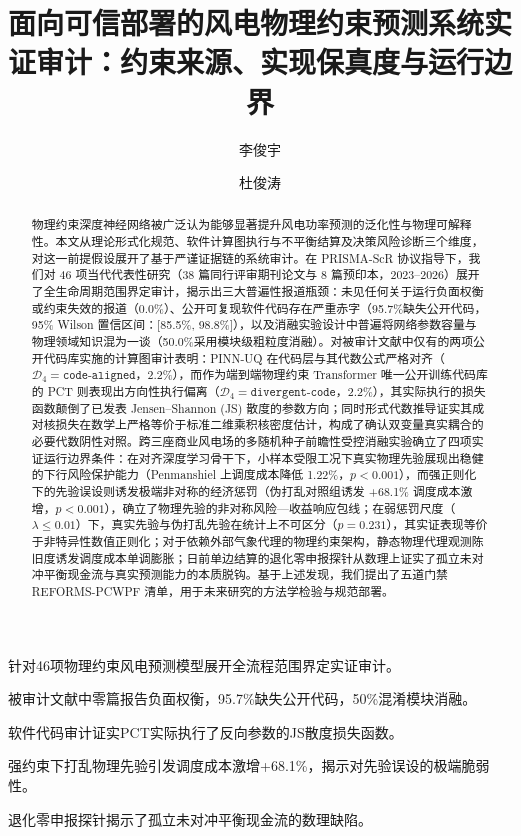 \documentclass[3p,twocolumn]{elsarticle}
\theoremstyle{definition}
\theoremstyle{remark}
\begin{document}
\begin{frontmatter}

\title{面向可信部署的风电物理约束预测系统实证审计：约束来源、实现保真度与运行边界}

\author[1]{李俊宇}

\author[1]{杜俊涛}

\address[1]{智能电力系统与计算能源交叉研究组，中国}


\begin{highlights}
\item 针对46项物理约束风电预测模型展开全流程范围界定实证审计。
\item 被审计文献中零篇报告负面权衡，95.7\%缺失公开代码，50\%混淆模块消融。
\item 软件代码审计证实PCT实际执行了反向参数的JS散度损失函数。
\item 强约束下打乱物理先验引发调度成本激增+68.1\%，揭示对先验误设的极端脆弱性。
\item 退化零申报探针揭示了孤立未对冲平衡现金流的数理缺陷。
\end{highlights}

\begin{abstract}
物理约束深度神经网络被广泛认为能够显著提升风电功率预测的泛化性与物理可解释性。本文从理论形式化规范、软件计算图执行与不平衡结算及决策风险诊断三个维度，对这一前提假设展开了基于严谨证据链的系统审计。在 PRISMA-ScR 协议指导下，我们对 46 项当代代表性研究（38 篇同行评审期刊论文与 8 篇预印本，2023--2026）展开了全生命周期范围界定审计，揭示出三大普遍性报道瓶颈：未见任何关于运行负面权衡或约束失效的报道（0.0\%）、公开可复现软件代码存在严重赤字（95.7\%缺失公开代码，95\% Wilson 置信区间：[85.5\%, 98.8\%]），以及消融实验设计中普遍将网络参数容量与物理领域知识混为一谈（50.0\%采用模块级粗粒度消融）。对被审计文献中仅有的两项公开代码库实施的计算图审计表明：PINN-UQ 在代码层与其代数公式严格对齐（$\mathcal{D}_4 = \texttt{code-aligned}$，2.2\%），而作为端到端物理约束 Transformer 唯一公开训练代码库的 PCT 则表现出方向性执行偏离（$\mathcal{D}_4 = \texttt{divergent-code}$，2.2\%），其实际执行的损失函数颠倒了已发表 Jensen--Shannon (JS) 散度的参数方向；同时形式代数推导证实其成对核损失在数学上严格等价于标准二维乘积核密度估计，构成了确认双变量真实耦合的必要代数阴性对照。跨三座商业风电场的多随机种子前瞻性受控消融实验确立了四项实证运行边界条件：在对齐深度学习骨干下，小样本受限工况下真实物理先验展现出稳健的下行风险保护能力（Penmanshiel 上调度成本降低 1.22\%，$p < 0.001$），而强正则化下的先验误设则诱发极端非对称的经济惩罚（伪打乱对照组诱发 +68.1\% 调度成本激增，$p < 0.001$），确立了物理先验的非对称风险—收益响应包线；在弱惩罚尺度（$\lambda \le 0.01$）下，真实先验与伪打乱先验在统计上不可区分（$p = 0.231$），其实证表现等价于非特异性数值正则化；对于依赖外部气象代理的物理约束架构，静态物理代理观测陈旧度诱发调度成本单调膨胀；日前单边结算的退化零申报探针从数理上证实了孤立未对冲平衡现金流与真实预测能力的本质脱钩。基于上述发现，我们提出了五道门禁 REFORMS-PCWPF 清单，用于未来研究的方法学检验与规范部署。
\end{abstract}


\end{frontmatter}
\end{document}
